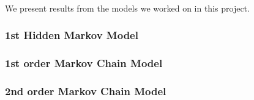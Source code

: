 %
\paragraph{}
We present results from the models we worked on in this project.
\subsubsection{1st Hidden Markov Model}

\subsubsection{1st order Markov Chain Model}

\subsubsection{2nd order Markov Chain Model}
